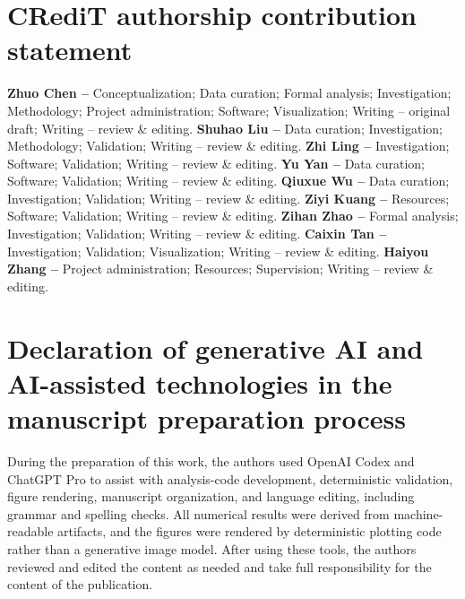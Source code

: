 \documentclass[11pt]{article}
\begin{document}
\section*{CRediT authorship contribution statement}
\textbf{Zhuo Chen --} Conceptualization; Data curation; Formal analysis;
Investigation; Methodology; Project administration; Software; Visualization;
Writing -- original draft; Writing -- review \& editing. \textbf{Shuhao Liu --}
Data curation; Investigation; Methodology; Validation; Writing -- review \&
editing. \textbf{Zhi Ling --} Investigation; Software; Validation; Writing --
review \& editing. \textbf{Yu Yan --} Data curation; Software; Validation;
Writing -- review \& editing. \textbf{Qiuxue Wu --} Data curation;
Investigation; Validation; Writing -- review \& editing. \textbf{Ziyi Kuang --}
Resources; Software; Validation; Writing -- review \& editing. \textbf{Zihan Zhao --}
Formal analysis; Investigation; Validation; Writing -- review \&
editing. \textbf{Caixin Tan --} Investigation; Validation; Visualization;
Writing -- review \& editing. \textbf{Haiyou Zhang --} Project administration;
Resources; Supervision; Writing -- review \& editing.

\section*{Declaration of generative AI and AI-assisted technologies in the manuscript preparation process}
During the preparation of this work, the authors used OpenAI Codex and ChatGPT
Pro to assist with analysis-code development, deterministic validation, figure
rendering, manuscript organization, and language editing, including grammar and
spelling checks. All numerical results were derived from machine-readable
artifacts, and the figures were rendered by deterministic plotting code rather
than a generative image model. After using these tools, the authors reviewed and
edited the content as needed and take full responsibility for the content of
the publication.
\end{document}

